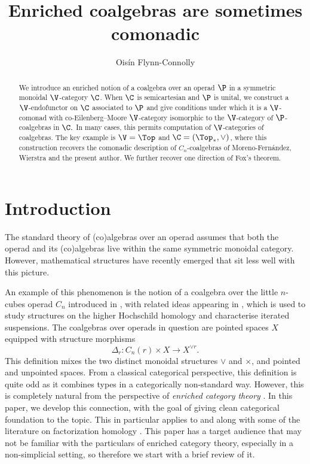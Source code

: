 \documentclass{tac}
\title{Enriched coalgebras are sometimes comonadic}
\author{Oisín Flynn-Connolly}
\def\bTop{{\Top_\ast}}
\begin{document}
\maketitle
\begin{abstract}
We introduce an enriched notion of a coalgebra over an operad $\P$ in a symmetric monoidal $\V$-category $\C$. When $\C$ is semicartesian and $\P$ is unital, we construct a $\V$-endofunctor on $\C$ associated to $\P$ and give conditions under which it is a $\V$-comonad with co-Eilenberg--Moore $\V$-category isomorphic to the $\V$-category of $\P$-coalgebras in $\C.$ In many cases, this permits computation of $\V$-categories of coalgebras. The key example is $\V = \Top$ and  $\C = (\bTop, \vee)$, where this construction recovers the comonadic 
description of $C_n$-coalgebras of Moreno-Fernández, Wierstra and the present author. We further 
recover one direction of Fox's theorem.
\end{abstract}

\section{Introduction}
The standard theory of (co)algebras over an operad \cite{Leinster04, fresse09, loday12} assumes that both the operad and its (co)algebras live within the same  symmetric monoidal category. However, mathematical structures have recently emerged that sit less well with this picture.

An example of this phenomenon is the notion of a coalgebra over the little $n$-cubes operad $C_n$ introduced in \cite{ginot12, me1}, with related ideas appearing in \cite{arone14, malin25}, which is used to study structures on the higher Hochschild homology and characterise iterated suspensions. 
The coalgebras over operads in question are pointed spaces $X$ equipped with structure morphisms
\begin{equation*}
\label{1steq}
\Delta_r: C_n(r) \times X \to X^{\vee r}.
\end{equation*}
 This definition mixes the two distinct monoidal structures $\vee$ and $\times$, and pointed and unpointed spaces. From a classical categorical perspective, this definition is quite odd as it combines types in a categorically non-standard way. However, this is completely natural from the perspective of \emph{enriched category theory} \cite{kelly05}. In this paper, we develop this connection, with the goal of giving clean categorical foundation to the topic. This in particular applies to \cite[Section 2]{me1} and \cite[Chapter 6]{flynnconnolly:tel-04974557} along with some of the literature on factorization homology \cite{ginot12, ginot15}. This paper has a target audience that may not be familiar with the particulars of enriched category theory, especially in a non-simplicial setting, so therefore we start with a brief review of it.
\end{document}
